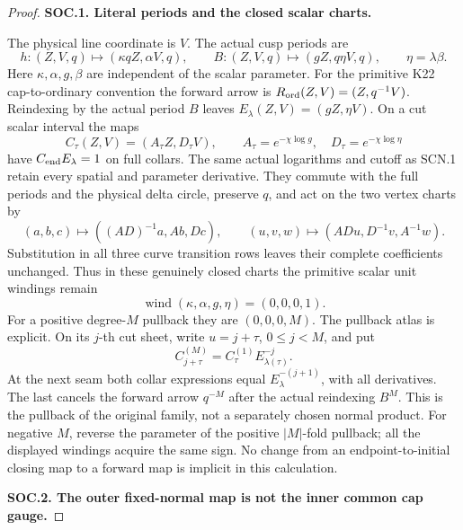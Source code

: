 \begin{proof}
\par\medskip\noindent\textbf{SOC.1. Literal periods and the closed scalar charts.}\par\nopagebreak[4]

The physical line coordinate is \(V\). The actual cusp periods are
\[
 h:(Z,V,q)\longmapsto(\kappa qZ,\alpha V,q),\qquad
 B:(Z,V,q)\longmapsto(gZ,q\eta V,q),\qquad
 \eta=\lambda\beta.
\]
Here \(\kappa,\alpha,g,\beta\) are independent of the scalar parameter.
For the primitive K22 cap-to-ordinary convention the forward arrow is
\(R_{\rm ord}(Z,V)=(Z,q^{-1}V)\). Reindexing by the actual period
\(B\) leaves \(E_\lambda(Z,V)=(gZ,\eta V)\). On a cut scalar
interval the maps
\[
 C_\tau(Z,V)=(A_\tau Z,D_\tau V),\qquad
 A_\tau=e^{-\chi\log g},\quad D_\tau=e^{-\chi\log\eta}
\]
have \(C_{\rm end}E_\lambda=1\) on full collars. The same actual
logarithms and cutoff as SCN.1 retain every spatial and parameter
derivative. They commute with the full periods and the physical delta
circle, preserve \(q\), and act on the two vertex charts by
\[
 (a,b,c)\mapsto((AD)^{-1}a,Ab,Dc),\qquad
 (u,v,w)\mapsto(ADu,D^{-1}v,A^{-1}w).
\]
Substitution in all three curve transition rows leaves their complete
coefficients unchanged. Thus in these genuinely closed charts the
primitive scalar unit windings remain
\[
 \operatorname{wind}(\kappa,\alpha,g,\eta)=(0,0,0,1).
 \tag{P3K.61.SOC.1}
\]
For a positive degree-\(M\) pullback they are \((0,0,0,M)\).
The pullback atlas is explicit. On its \(j\)-th cut sheet, write
\(u=j+\tau\), \(0\le j<M\), and put
\[
 C^{(M)}_{j+\tau}=C^{(1)}_\tau E_{\lambda(\tau)}^{-j}.
\]
At the next seam both collar expressions equal
\(E_\lambda^{-(j+1)}\), with all derivatives. The last cancels the
forward arrow \(q^{-M}\) after the actual reindexing \(B^M\).
This is the pullback of the original family, not a separately chosen
normal product. For negative \(M\), reverse the parameter of the
positive \(|M|\)-fold pullback; all the displayed windings acquire
the same sign. No change from an endpoint-to-initial closing map to a
forward map is implicit in this calculation.

\par\medskip\noindent\textbf{SOC.2. The outer fixed-normal map is not the inner common cap gauge.}\par\nopagebreak[4]


\end{proof}
